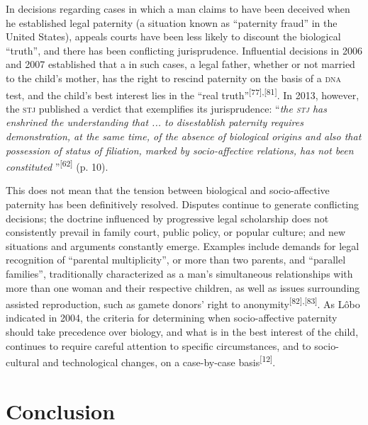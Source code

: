 \documentclass{article}
\begin{document}
In decisions regarding cases in which a man claims to have been deceived when he
established legal paternity (a situation known as “paternity fraud” in the
United States), appeals courts have been less likely to discount the biological
“truth”, and there has been conflicting jurisprudence. Influential decisions in
2006 and 2007 established that a in such cases, a legal father, whether or not
married to the child’s mother, has the right to rescind paternity on the basis
of a \textsc{dna} test, and the child’s best interest lies in the “real truth”\textsuperscript{[}\textsuperscript{77}\textsuperscript{]}\textsuperscript{,}\textsuperscript{[}\textsuperscript{81}\textsuperscript{]}. In 2013, however, the \textsc{stj} published a verdict that exemplifies its
jurisprudence: “\textit{the \textsc{stj} has enshrined the understanding that ... to
disestablish paternity requires demonstration, at the same time, of the absence
of biological origins and also that possession of status of filiation, marked by
socio-affective relations, has not been constituted}
”\textsuperscript{[}\textsuperscript{62}\textsuperscript{]}
(p. 10).

This does not mean that the tension between biological and socio-affective
paternity has been definitively resolved. Disputes continue to generate
conflicting decisions; the doctrine influenced by progressive legal scholarship
does not consistently prevail in family court, public policy, or popular
culture; and new situations and arguments constantly emerge. Examples include
demands for legal recognition of “parental multiplicity”, or more than two
parents, and “parallel families”, traditionally characterized as a man’s
simultaneous relationships with more than one woman and their respective
children, as well as issues surrounding assisted reproduction, such as gamete
donors’ right to anonymity\textsuperscript{[}\textsuperscript{82}\textsuperscript{]}\textsuperscript{,}\textsuperscript{[}\textsuperscript{83}\textsuperscript{]}. As Lôbo indicated in 2004, the criteria for determining when socio-affective
paternity should take precedence over biology, and what is in the best interest
of the child, continues to require careful attention to specific circumstances,
and to socio-cultural and technological changes, on a case-by-case basis\textsuperscript{[}\textsuperscript{12}\textsuperscript{]}.

\section{Conclusion}
\end{document}
